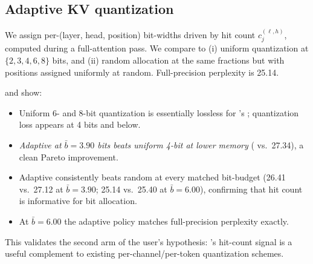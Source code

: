 \subsection{Adaptive KV quantization}
\label{sec:results:quant}

 We assign per-(layer, head, position) bit-widths driven by hit count $c_j^{(\ell, h)}$, computed during a full-attention pass. We compare to (i) uniform quantization at $\{2, 3, 4, 6, 8\}$ bits, and (ii) random allocation at the same fractions but with positions assigned uniformly at random. Full-precision perplexity is 25.14.

  and  show:
\begin{itemize}[leftmargin=*,itemsep=0pt,topsep=0pt]
    \item Uniform 6- and 8-bit quantization is essentially lossless for \gpttwo's \kvcache; quantization loss appears at 4 bits and below.
    \item \emph{Adaptive at $\bar{b} = 3.90$ bits beats uniform 4-bit at lower memory} ( vs.\ 27.34), a clean Pareto improvement.
    \item Adaptive consistently beats random at every matched bit-budget (26.41 vs.\ 27.12 at $\bar{b} = 3.90$; 25.14 vs.\ 25.40 at $\bar{b} = 6.00$), confirming that hit count is informative for bit allocation.
    \item At $\bar{b} = 6.00$ the adaptive policy matches full-precision perplexity exactly.
\end{itemize}
This validates the second arm of the user's hypothesis: \hma's hit-count signal is a useful complement to existing per-channel/per-token \kvcache quantization schemes.


